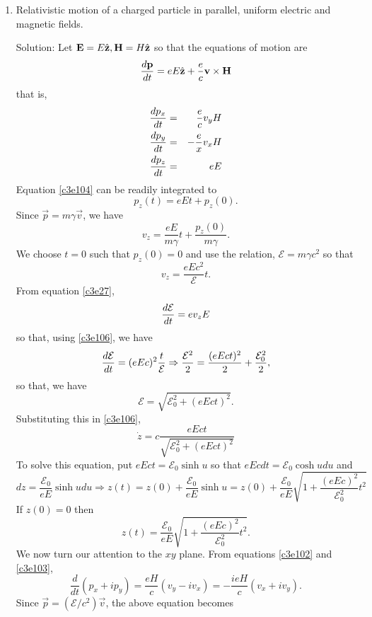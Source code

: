 \begin{enumerate}
\item Relativistic motion of a charged particle in parallel, uniform electric
and magnetic fields.
\item[Solution:] Let $\mathbf{E} = E\hat{\mathbf{z}}, \mathbf{H} = H\hat{\mathbf{z}}$ so that the equations
of motion are
\[
\frac{d{\mathbf{p}}}{d{t}} = eE\hat{\mathbf{z}} + \frac{e}{c}\mathbf{v}\times\mathbf{H}
\]
that is,
\begin{eqnarray}
\frac{d{p_x}}{d{t}} &=& \frac{e}{c}v_yH \label{c3e103} \\
\frac{d{p_y}}{d{t}} &=& -\frac{e}{x}v_xH \label{c3e104} \\
\frac{d{p_z}}{d{t}} &=& eE \label{c3e105} 
\end{eqnarray}
Equation \eqref{c3e104} can be readily integrated to
\[
p_z(t) = eEt + p_z(0).
\]
Since $\vec{p} = m\gamma\vec{v}$, we have
\begin{equation}\label{c3e106} 
v_z = \frac{eE}{m\gamma}t + \frac{p_z(0)}{m\gamma}.
\end{equation}
We choose $t = 0$ such that $p_z(0) = 0$ and use the relation, 
$\mathcal{E} = m\gamma c^2$ so that
\begin{equation}\label{c3e107}
v_z = \frac{eEc^2}{\mathcal{E}}t.
\end{equation} 
From equation \eqref{c3e27},
\[
\frac{d{\mathcal{E}}}{d{t}} = ev_zE
\]
so that, using \eqref{c3e106}, we have 
\[
\frac{d{\mathcal{E}}}{d{t}} = (eEc)^2\frac{t}{\mathcal{E}} \Rightarrow
\frac{\mathcal{E}^2}{2} = \frac{(eEct)^2}{2} + \frac{\mathcal{E}_0^2}{2},
\]
so that, we have
\begin{equation}\label{c3e108}
\mathcal{E} = \sqrt{\mathcal{E}_0^2 + (eEct)^2}.
\end{equation}
Substituting this in \eqref{c3e106},
\[
\dot{z} = c\frac{eEct}{\sqrt{\mathcal{E}_0^2 + (eEct)^2}}
\]
To solve this equation, put $eEct = \mathcal{E}_0\sinh u$ so that $eEcdt = 
\mathcal{E}_0\cosh udu$ and
\[
dz = \frac{\mathcal{E}_0}{eE}\sinh udu \Rightarrow
z(t) = z(0) + \frac{\mathcal{E}_0}{eE}\sinh u = z(0) + \frac{\mathcal{E}_0}{eE}
\sqrt{1 + \frac{(eEc)^2}{\mathcal{E}_0^2}t^2}
\]
If $z(0) = 0$ then 
\begin{equation}\label{c3e109}
z(t) = \frac{\mathcal{E}_0}{eE}\sqrt{1 + \frac{(eEc)^2}{\mathcal{E}_0^2}t^2}.
\end{equation}
We now turn our attention to the $xy$ plane. From equations \eqref{c3e102} and
\eqref{c3e103},
\[
\frac{d}{dt}(p_x + ip_y) = \frac{eH}{c}(v_y - iv_x) = -\frac{ieH}{c}(v_x + iv_y).
\]
Since $\vec{p} = (\mathcal{E}/c^2)\vec{v}$, the above equation becomes
\begin{equation}\label{c3e110}

\end{equation}
\end{enumerate}
